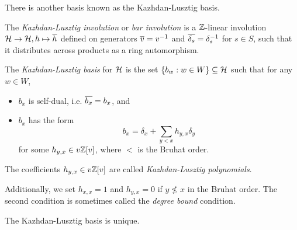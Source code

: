 \n{}

There is another basis known as the Kazhdan-Lusztig basis.

\begin{definition}
    The \textit{Kazhdan-Lusztig involution} or \textit{bar involution} is a $\mathbb{Z}$-linear involution $\mathcal{H} \to \mathcal{H}, h \mapsto \overline{h}$ defined on generators $\overline{v} = v^{-1}$ and $\overline{\delta_s} = \delta_s^{-1}$ for $s \in S$, such that it distributes across products as a ring automorphism.
\end{definition}


\begin{definition}
    The \textit{Kazhdan-Lusztig basis} for $\mathcal{H}$ is the set $\{b_w : w \in W\} \subseteq \mathcal{H}$ such that for any $w \in W$,
    \begin{itemize}
        \item $b_x$ is self-dual, i.e. $\overline{b_x} = b_x$, and
        \item $b_x$ has the form
              \[
                  b_x = \delta_x + \sum_{y<x} h_{y,x} \delta_y
              \]
              for some $h_{y,x} \in v\mathbb{Z}[v]$, where $<$ is the Bruhat order.
    \end{itemize}
    The coefficients $h_{y,x} \in v\mathbb{Z}[v]$ are called \textit{Kazhdan-Lusztig polynomials}.
\end{definition}

Additionally, we set $h_{x,x} = 1$ and $h_{y,x} = 0$ if $y \not\leq x$ in the Bruhat order. The second condition is sometimes called the \textit{degree bound} condition.

\begin{lemma}
    The Kazhdan-Lusztig basis is unique.
\end{lemma}

\n{}

\n{}

\n{}

\n{}
